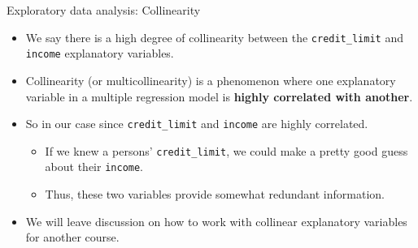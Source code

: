 \documentclass[
  ignorenonframetext,
]{beamer}
\providecommand{\tightlist}{%
  \setlength{\itemsep}{0pt}\setlength{\parskip}{0pt}}
\begin{document}
\begin{frame}[fragile]{Exploratory data analysis: Collinearity}
\protect\hypertarget{exploratory-data-analysis-collinearity}{}
\begin{itemize}
\item
  We say there is a high degree of collinearity between the
  \texttt{credit\_limit} and \texttt{income} explanatory variables.
\item
  Collinearity (or multicollinearity) is a phenomenon where one
  explanatory variable in a multiple regression model is \textbf{highly
  correlated with another}.
\item
  So in our case since \texttt{credit\_limit} and \texttt{income} are
  highly correlated.

  \begin{itemize}
  \tightlist
  \item
    If we knew a persons' \texttt{credit\_limit}, we could make a pretty
    good guess about their \texttt{income}.
  \item
    Thus, these two variables provide somewhat redundant information.
  \end{itemize}
\item
  We will leave discussion on how to work with collinear explanatory
  variables for another course.
\end{itemize}
\end{frame}
\end{document}
